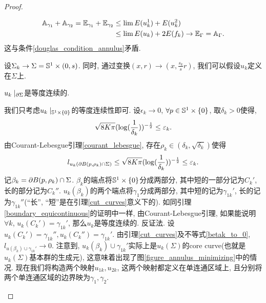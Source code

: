 \begin{proof}
\begin{claim}
\begin{subproof}
\begin{equation}
\begin{split}
                    \AA_{\gamma_1}+\AA_{\gamma_2} = \EE_{\gamma_1}+\EE_{\gamma_2} & \le  \lim E({u}_k^1)+E({u}_k^2)  \\
                    &\le \lim E(u_k) + 2E(f_k) \to \EE_\Gamma=\AA_\Gamma.
                \end{split}
            \end{equation}
            这与条件\eqref{douglas_condition_annulus}矛盾.
        \end{subproof}
    \end{claim}
    设$\Sigma_k \to \Sigma = \S^1 \times (0,s)$. 同时, 通过变换$(x,r) \to (x,\frac{s_k}{s}r)$, 我们可以假设$u_k$定义在$\Sigma$上.
    \begin{claim}
        $u_k\mid_{\P \Sigma}$是等度连续的.
        \begin{subproof}
            我们只考虑$u_k\mid_{\S^1 \times \{0\}}$的等度连续性即可.  设$\epsilon_k \to 0$,  $\forall p \in \S^1 \times \{0\}$, 取$\delta_k>0$使得, 
            \begin{equation}
                \sqrt{8K\pi}(\log(\rec{\delta_k}))^{-\rec{2}} \le \epsilon_k.
            \end{equation}
            由Courant-Lebesgue引理\eqref{courant_lebesgue}, 存在$\rho_k \in (\delta_k,\sqrt{\delta_k})$使得
            \begin{equation} \label{betak_to_0}
                l_{u_k(\P B(p,\rho_k) \cap \Sigma)} \le \sqrt{8K\pi}(\log(\rec{\delta_k}))^{-\rec{2}} \le \epsilon_k.
            \end{equation}
            记$\beta_k=\P B(p,\rho_k) \cap \Sigma$. $\beta_k$的端点将$\S^1 \times \{0\}$分成两部分, 其中短的一部分记为$C_k'$, 长的部分记为$C_k''$. $u_k(\beta_k)$的两个端点将$\gamma_1$分成两部分, 其中短的记为$\gamma_{1k}'$, 长的记为$\gamma_{1k}''$(``长'', ``短''是在引理\eqref{cut_curves}意义下的). 如同引理\eqref{boundary_equicontinuous}的证明中一样, 由Courant-Lebesgue引理,  如果能说明$\forall k$, $u_k(C_k')=\gamma_{1k}'$, 那么$u_k$是等度连续的.  反证法. 设$u_k(C_k')=\gamma_{1k}'', u_k(C_k'')=\gamma_{1k}'$. 由引理\eqref{cut_curves}及不等式\eqref{betak_to_0}, $l_{u(\beta_k)\cup \gamma_{1k}'} \to 0$.  注意到, $u_k(\beta_k) \cup \gamma_{1k}'$实际上是$u_k(\Sigma)$的core curve(也就是$u_k(\Sigma)$基本群的生成元), 这意味着出现了图\eqref{figure_annulus_minimizing}中的情况. 现在我们将构造两个映射$u_{1k}, u_{2k}$, 这两个映射都定义在单连通区域上, 且分别将两个单连通区域的边界映为$\gamma_1, \gamma_2$. 
            \begin{figure}[ht]
                \centering

\end{figure}
\end{subproof}
\end{claim}
\end{proof}
